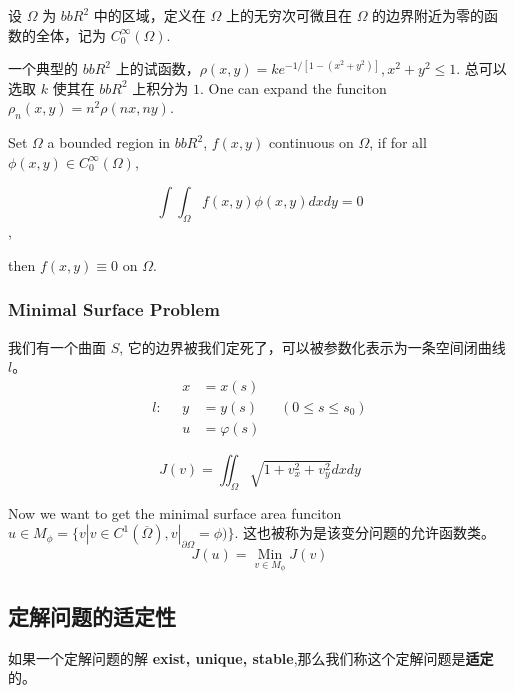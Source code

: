 \begin{definition}
设 $\Omega$ 为 $bbR^2$ 中的区域，定义在 $\Omega$ 上的无穷次可微且在 $\Omega$ 的边界附近为零的函数的全体，记为 $C_0^\infty(\Omega)$.
\end{definition}

一个典型的 $bbR^2$ 上的试函数，$\rho(x,y)=ke^{-1/[1-(x^2+y^2)]}, x^2+y^2\leq 1$. 总可以选取 $k$ 使其在 $bbR^2$ 上积分为 $1$. One can expand the funciton $\rho_n(x,y)=n^2 \rho(nx,ny)$.

\begin{lemma}
Set $\Omega$ a bounded region in $bbR^2$, $f(x,y)$ continuous on $\Omega$, if for all $\phi(x,y)\in C_0^\infty (\Omega)$,

$$\int\int_{\Omega} f(x,y)\phi(x,y)dxdy=0$$,

then $f(x,y)\equiv 0$ on $\Omega$.
\end{lemma}

\subsubsection{Minimal Surface Problem}

我们有一个曲面 $S$, 它的边界被我们定死了，可以被参数化表示为一条空间闭曲线 $l$。
\begin{equation}
l:\quad\begin{aligned} x &=x(s) \\ y &=y(s) \\ u &=\varphi(s) \end{aligned} \quad\left(0 \leqslant s \leqslant s_{0}\right)
\end{equation}

\begin{equation}
J(v)=\iint_{\Omega} \sqrt{1+v_{x}^{2}+v_{y}^{2}} d x d y
\end{equation}

Now we want to get the minimal surface area funciton $u\in M_\phi=\{v|v\in C^1 (\overline{\Omega}),v|_{\partial \Omega}=\phi)\}$. 这也被称为是该变分问题的允许函数类。
\begin{equation}
J(u)=\underset{v \in M_{\phi}}{\operatorname{Min}} J(v)
\end{equation}

\subsection{定解问题的适定性}

如果一个定解问题的解 \textbf{exist, unique, stable},那么我们称这个定解问题是\textbf{适定} 的。

